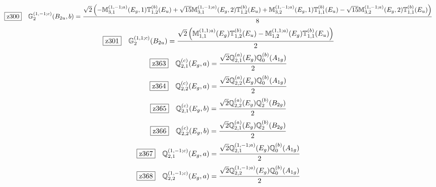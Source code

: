 \documentclass[fleqn,10pt,landscape]{jsarticle}
\begin{document}
\begin{dmath*}
\hspace*{3mm}\fbox{z300}\quad \mathbb{G}_{2}^{(1,-1;c)}(B_{2u},b)=\frac{\sqrt{2} \left(- \mathbb{M}_{3,1}^{(1,-1;a)}(E_{g},1) \mathbb{T}_{1,2}^{(b)}(E_{u}) + \sqrt{15} \mathbb{M}_{3,1}^{(1,-1;a)}(E_{g},2) \mathbb{T}_{1,2}^{(b)}(E_{u}) + \mathbb{M}_{3,2}^{(1,-1;a)}(E_{g},1) \mathbb{T}_{1,1}^{(b)}(E_{u}) - \sqrt{15} \mathbb{M}_{3,2}^{(1,-1;a)}(E_{g},2) \mathbb{T}_{1,1}^{(b)}(E_{u})\right)}{8}
\end{dmath*}
\begin{dmath*}
\hspace*{3mm}\fbox{z301}\quad \mathbb{G}_{2}^{(1,1;c)}(B_{2u})=\frac{\sqrt{2} \left(\mathbb{M}_{1,1}^{(1,1;a)}(E_{g}) \mathbb{T}_{1,2}^{(b)}(E_{u}) - \mathbb{M}_{1,2}^{(1,1;a)}(E_{g}) \mathbb{T}_{1,1}^{(b)}(E_{u})\right)}{2}
\end{dmath*}
\begin{dmath*}
\hspace*{3mm}\fbox{z363}\quad \mathbb{Q}_{2,1}^{(c)}(E_{g},a)=\frac{\sqrt{2} \mathbb{Q}_{2,1}^{(a)}(E_{g}) \mathbb{Q}_{0}^{(b)}(A_{1g})}{2}
\end{dmath*}
\begin{dmath*}
\hspace*{3mm}\fbox{z364}\quad \mathbb{Q}_{2,2}^{(c)}(E_{g},a)=\frac{\sqrt{2} \mathbb{Q}_{2,2}^{(a)}(E_{g}) \mathbb{Q}_{0}^{(b)}(A_{1g})}{2}
\end{dmath*}
\begin{dmath*}
\hspace*{3mm}\fbox{z365}\quad \mathbb{Q}_{2,1}^{(c)}(E_{g},b)=\frac{\sqrt{2} \mathbb{Q}_{2,2}^{(a)}(E_{g}) \mathbb{Q}_{2}^{(b)}(B_{2g})}{2}
\end{dmath*}
\begin{dmath*}
\hspace*{3mm}\fbox{z366}\quad \mathbb{Q}_{2,2}^{(c)}(E_{g},b)=\frac{\sqrt{2} \mathbb{Q}_{2,1}^{(a)}(E_{g}) \mathbb{Q}_{2}^{(b)}(B_{2g})}{2}
\end{dmath*}
\begin{dmath*}
\hspace*{3mm}\fbox{z367}\quad \mathbb{Q}_{2,1}^{(1,-1;c)}(E_{g},a)=\frac{\sqrt{2} \mathbb{Q}_{2,1}^{(1,-1;a)}(E_{g}) \mathbb{Q}_{0}^{(b)}(A_{1g})}{2}
\end{dmath*}
\begin{dmath*}
\hspace*{3mm}\fbox{z368}\quad \mathbb{Q}_{2,2}^{(1,-1;c)}(E_{g},a)=\frac{\sqrt{2} \mathbb{Q}_{2,2}^{(1,-1;a)}(E_{g}) \mathbb{Q}_{0}^{(b)}(A_{1g})}{2}
\end{dmath*}
\end{document}
